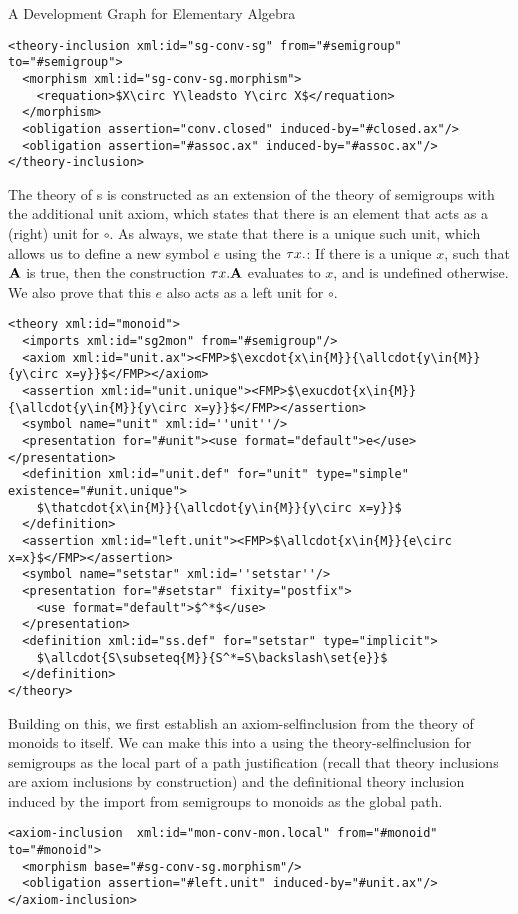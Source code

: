 \begin{tchapter}[id=dg-elal]{A Development Graph for Elementary Algebra}
\begin{lstlisting}[mathescape,
  index={theory-inclusion,morphism,requation}]
<theory-inclusion xml:id="sg-conv-sg" from="#semigroup" to="#semigroup">
  <morphism xml:id="sg-conv-sg.morphism">
    <requation>$X\circ Y\leadsto Y\circ X$</requation>
  </morphism>
  <obligation assertion="conv.closed" induced-by="#closed.ax"/>
  <obligation assertion="#assoc.ax" induced-by="#assoc.ax"/>
</theory-inclusion>
\end{lstlisting}
The theory of {s} is constructed as an extension of the theory of semigroups
with the additional unit axiom, which states that there is an element that acts as a
(right) unit for $\circ$. As always, we state that there is a unique such unit, which
allows us to define a new symbol $e$ using the
{} ${\tau{x}.{}}$: If there is a unique $x$,
such that ${\bf A}$ is true, then the construction ${\tau{x}.{{\bf A}}}$ evaluates to $x$, and is
undefined otherwise. We also prove that this $e$ also acts as a left unit for $\circ$.

\begin{lstlisting}[mathescape]
<theory xml:id="monoid">
  <imports xml:id="sg2mon" from="#semigroup"/>
  <axiom xml:id="unit.ax"><FMP>$\excdot{x\in{M}}{\allcdot{y\in{M}}{y\circ x=y}}$</FMP></axiom>
  <assertion xml:id="unit.unique"><FMP>$\exucdot{x\in{M}}{\allcdot{y\in{M}}{y\circ x=y}}$</FMP></assertion>
  <symbol name="unit" xml:id=''unit''/>
  <presentation for="#unit"><use format="default">e</use></presentation>
  <definition xml:id="unit.def" for="unit" type="simple" existence="#unit.unique">
    $\thatcdot{x\in{M}}{\allcdot{y\in{M}}{y\circ x=y}}$
  </definition>
  <assertion xml:id="left.unit"><FMP>$\allcdot{x\in{M}}{e\circ x=x}$</FMP></assertion>
  <symbol name="setstar" xml:id=''setstar''/>
  <presentation for="#setstar" fixity="postfix">
    <use format="default">$^*$</use>
  </presentation>
  <definition xml:id="ss.def" for="setstar" type="implicit">
    $\allcdot{S\subseteq{M}}{S^*=S\backslash\set{e}}$
  </definition>
</theory>
\end{lstlisting}

Building on this, we first establish an axiom-selfinclusion from the theory of
monoids to itself. We can make this into a {} using
the theory-selfinclusion for semigroups as the local part of a path justification
(recall that theory inclusions are axiom inclusions by construction) and the
definitional theory inclusion induced by the import from semigroups to monoids as
the global path.
\begin{lstlisting}[mathescape,index={axiom-inclusion,theory-inclusion,morphism,obligation}]
<axiom-inclusion  xml:id="mon-conv-mon.local" from="#monoid" to="#monoid">
  <morphism base="#sg-conv-sg.morphism"/>
  <obligation assertion="#left.unit" induced-by="#unit.ax"/>
</axiom-inclusion>


\end{lstlisting}
\end{tchapter}
